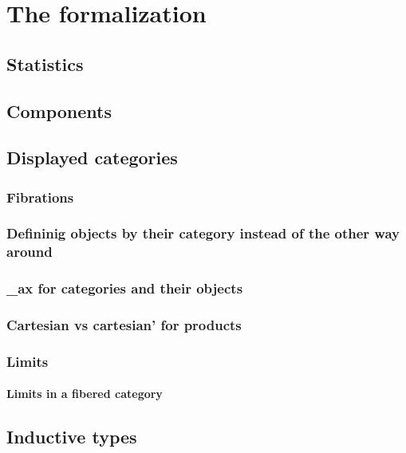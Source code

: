 \chapter{The formalization}

\section{Statistics}

\section{Components}

\section{Displayed categories}\label{sec:displayed-categories}

\subsection{Fibrations}

\subsection{Defininig objects by their category instead of the other way around}

\subsection{\_ax for categories and their objects}

\subsection{Cartesian vs cartesian' for products}

\subsection{Limits}

\subsubsection{Limits in a fibered category}

\section{Inductive types}

